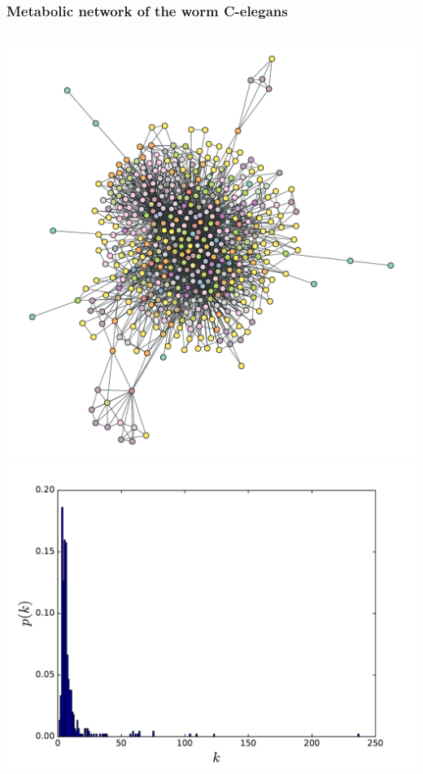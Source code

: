 \documentclass{beamer}
\begin{document}
\begin{frame}
    \frametitle{Metabolic network of the worm C-elegans}
    \begin{columns}
        \centering
        \includegraphics[width=\columnwidth]{celegans_metabolic.pdf}
        \centering
        \includegraphics[width=\columnwidth]{deg_distri_celegans_metabolic.pdf}
    \end{columns}
\end{frame}
\end{document}
